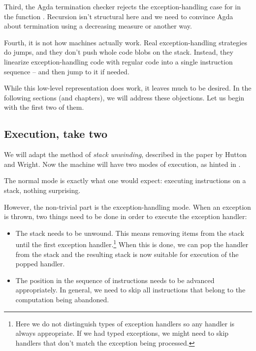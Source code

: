 Third, the Agda termination checker rejects the exception-handling case for
 in the function . Recursion isn't structural
here and we need to convince Agda about termination using a decreasing measure
or another way.

Fourth, it is not how machines actually work. Real exception-handling strategies do jumps,
and they don't push whole code blobs on the stack. Instead, they linearize exception-handling
code with regular code into a single instruction sequence -- and then jump to it if needed.

While this low-level representation does work, it leaves much to be desired. In the following
sections (and chapters), we will address these objections. Let us begin with the first two
of them.

\subsection{Execution, take two}

We will adapt the method of \emph{stack unwinding}, described in the paper by Hutton
and Wright. Now the machine will have two modes of execution, as hinted in
\cite[p.~7]{gmh:exceptions}.

The normal mode is exactly what one would expect: executing instructions on a stack, nothing surprising.

However, the non-trivial part is the exception-handling mode. When an exception is thrown,
two things need to be done in order to execute the exception handler:
\begin{itemize}
	\item The stack needs to be unwound. This means removing items from the stack
		until the first exception handler.\footnote{Here we do not distinguish types
		of exception handlers so any handler is always appropriate. If we had typed
		exceptions, we might need to skip handlers that don't match the exception
		being processed.} When this is done, we can pop the handler from the stack
		and the resulting stack is now suitable for execution of the popped handler.
	\item The position in the sequence of instructions needs to be advanced
		appropriately. In general, we need to skip all instructions that belong
		to the computation being abandoned.
\end{itemize}


